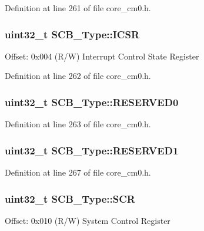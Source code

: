 Definition at line 261 of file core\+\_\+cm0.\+h.

\subsubsection[{\texorpdfstring{I\+C\+SR}{ICSR}}]{ uint32\+\_\+t S\+C\+B\+\_\+\+Type\+::\+I\+C\+SR}\hypertarget{struct_s_c_b___type_a3e66570ab689d28aebefa7e84e85dc4a}{}\label{struct_s_c_b___type_a3e66570ab689d28aebefa7e84e85dc4a}
Offset\+: 0x004 (R/W) Interrupt Control State Register 

Definition at line 262 of file core\+\_\+cm0.\+h.

\subsubsection[{\texorpdfstring{R\+E\+S\+E\+R\+V\+E\+D0}{RESERVED0}}]{\setlength{\rightskip}{0pt plus 5cm}uint32\+\_\+t S\+C\+B\+\_\+\+Type\+::\+R\+E\+S\+E\+R\+V\+E\+D0}\hypertarget{struct_s_c_b___type_a10960cdc703f661c83a237d9c69db23c}{}\label{struct_s_c_b___type_a10960cdc703f661c83a237d9c69db23c}


Definition at line 263 of file core\+\_\+cm0.\+h.

\subsubsection[{\texorpdfstring{R\+E\+S\+E\+R\+V\+E\+D1}{RESERVED1}}]{\setlength{\rightskip}{0pt plus 5cm}uint32\+\_\+t S\+C\+B\+\_\+\+Type\+::\+R\+E\+S\+E\+R\+V\+E\+D1}\hypertarget{struct_s_c_b___type_adddd65958c1c4c0301f62ede0a9bf12e}{}\label{struct_s_c_b___type_adddd65958c1c4c0301f62ede0a9bf12e}


Definition at line 267 of file core\+\_\+cm0.\+h.

\subsubsection[{\texorpdfstring{S\+CR}{SCR}}]{ uint32\+\_\+t S\+C\+B\+\_\+\+Type\+::\+S\+CR}\hypertarget{struct_s_c_b___type_abfad14e7b4534d73d329819625d77a16}{}\label{struct_s_c_b___type_abfad14e7b4534d73d329819625d77a16}
Offset\+: 0x010 (R/W) System Control Register 

